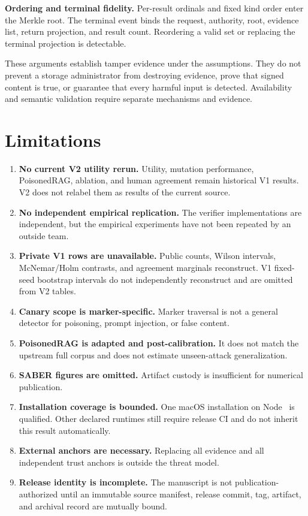 \documentclass[10pt]{article}
\begin{document}
\textbf{Ordering and terminal fidelity.} Per-result ordinals and fixed kind
order enter the Merkle root. The terminal event binds the request, authority,
root, evidence list, return projection, and result count. Reordering a valid set
or replacing the terminal projection is detectable.

These arguments establish tamper evidence under the assumptions. They do not
prevent a storage administrator from destroying evidence, prove that signed
content is true, or guarantee that every harmful input is detected. Availability
and semantic validation require separate mechanisms and evidence.

\section{Limitations}

\begin{enumerate}
  \item \textbf{No current V2 utility rerun.} Utility, mutation performance,
  PoisonedRAG, ablation, and human agreement remain historical V1 results. V2
  does not relabel them as results of the current source.
  \item \textbf{No independent empirical replication.} The verifier
  implementations are independent, but the empirical experiments have not been
  repeated by an outside team.
  \item \textbf{Private V1 rows are unavailable.} Public counts, Wilson
  intervals, McNemar/Holm contrasts, and agreement marginals reconstruct. V1
  fixed-seed bootstrap intervals do not independently reconstruct and are
  omitted from V2 tables.
  \item \textbf{Canary scope is marker-specific.} Marker traversal is not a
  general detector for poisoning, prompt injection, or false content.
  \item \textbf{PoisonedRAG is adapted and post-calibration.} It does not match
  the upstream full corpus and does not estimate unseen-attack generalization.
  \item \textbf{SABER figures are omitted.} Artifact custody is insufficient
  for numerical publication.
  \item \textbf{Installation coverage is bounded.} One macOS installation on
  Node \MutMemInstallerNodeVersion\ is qualified. Other declared runtimes still
  require release CI and do not inherit this result automatically.
  \item \textbf{External anchors are necessary.} Replacing all evidence and all
  independent trust anchors is outside the threat model.
  \item \textbf{Release identity is incomplete.} The manuscript is not
  publication-authorized until an immutable source manifest, release commit,
  tag, artifact, and archival record are mutually bound.
\end{enumerate}
\end{document}
